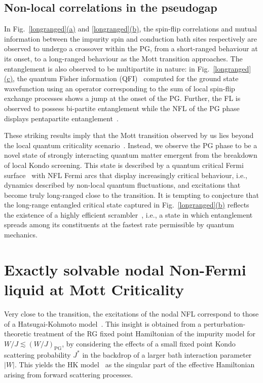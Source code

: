 \subsection{Non-local correlations in the pseudogap}
In Fig.~\hyperref[longranged]{\ref*{longranged}(a)} and \hyperref[longranged]{\ref*{longranged}(b)}, the spin-flip correlations and mutual information between the impurity spin and conduction bath sites respectively are observed to undergo a crossover within the PG, from a short-ranged behaviour at its onset, to a long-ranged behaviour as the Mott transition approaches. The entanglement is also observed to be multipartite in nature: in Fig.~\hyperref[longranged]{\ref*{longranged}(c)}, the quantum Fisher information (QFI)~\cite{Hauke2016} computed for the ground state wavefunction using an operator corresponding to the sum of local spin-flip exchange processes shows a jump at the onset of the PG. Further, the FL is observed to possess bi-partite entanglement while the NFL of the PG phase displays pentapartite entanglement~\cite{balut2025,mazza2024}.

These striking results imply that the Mott transition observed by us lies beyond the local quantum criticality scenario~\cite{Si2001}. Instead,  we observe the PG phase to be a novel state of strongly interacting quantum matter emergent from the breakdown of local Kondo screening. This state is described by a quantum critical Fermi surface~\cite{senthil2008CriticalFermiSurface} with NFL Fermi arcs that display increasingly critical behaviour, i.e., dynamics described by non-local quantum fluctuations, and excitations that become truly long-ranged close to the transition. It is tempting to conjecture that the long-range entangled critical state captured in Fig.~\hyperref[longranged]{\ref*{longranged}(b)} reflects the existence of a highly efficient scrambler~\cite{sekino2008,hayden2007,bentsen2019}, i.e., a state in which entanglement spreads among its constituents at the fastest rate permissible by quantum mechanics.  

\section{Exactly solvable nodal Non-Fermi liquid at Mott Criticality}\label{exactsolforMottCrit}
Very close to the transition, the excitations of the nodal NFL correspond to those of a Hatsugai-Kohmoto model~\cite{Baskaran1991,Hatsugai1992}. This insight is obtained from a perturbation-theoretic treatment of the RG fixed point Hamiltonian of the impurity model for $W/J\lesssim (W/J)_{\text{PG}}$, by considering the effects of a small fixed point Kondo scattering probability \(J^*\) in the backdrop of a larger bath interaction parameter \(|W|\). This yields the HK model~\cite{Baskaran1991,Hatsugai1992} as the singular part of the effective Hamiltonian arising from forward scattering processes.

